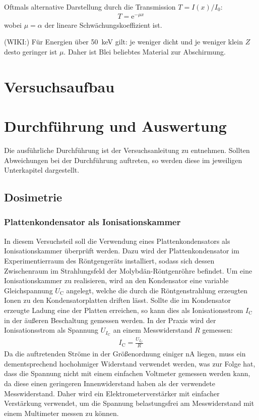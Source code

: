 \documentclass[11pt, a4paper]{article}
\numberwithin{equation}{section}
\begin{document}
Oftmals alternative Darstellung durch die Transmission $T = I(x)/I_0$:
\begin{align}
	T = \mathrm{e}^{-\mu x}
\end{align}
wobei $\mu = \alpha$ der lineare Schwächungskoeffizient ist.

(WIKI:) Für Energien über \SI{50}{keV} gilt:
je weniger dicht und je weniger klein $Z$ desto geringer ist $\mu$. Daher ist Blei beliebtes Material zur Abschirmung.

\section{Versuchsaufbau}

\section{Durchführung und Auswertung}
Die ausführliche Durchführung ist der Versuchsanleitung \cite{anleitung} zu entnehmen.
Sollten Abweichungen bei der Durchführung auftreten, so werden diese im jeweiligen Unterkapitel dargestellt.

\subsection{Dosimetrie}

\subsubsection{Plattenkondensator als Ionisationskammer}
In diesem Versuchsteil soll die Verwendung eines Plattenkondensators als Ionisationskammer überprüft werden.
Dazu wird der Plattenkondensator im Experimentierraum des Röntgengeräts installiert, sodass sich dessen Zwischenraum im Strahlungsfeld der Molybdän-Röntgenröhre befindet.
Um eine Ionisationskammer zu realisieren, wird an den Kondensator eine variable Gleichspannung $U_\mathrm{C}$ angelegt, welche die durch die Röntgenstrahlung erzeugten Ionen zu den Kondensatorplatten driften lässt.
Sollte die im Kondensator erzeugte Ladung eine der Platten erreichen, so kann dies als Ionisationsstrom $I_\mathrm{C}$ in der äußeren Beschaltung gemessen werden.
In der Praxis wird der Ionisationsstrom als Spannung $U_{I_\mathrm{C}}$ an einem Messwiderstand $R$ gemessen:
\begin{align}
	I_\mathrm{C} = \frac{U_{I_\mathrm{C}}}{R}
	\label{eq:ohm_ionisationsstrom}
\end{align}
Da die auftretenden Ströme in der Größenordnung einiger \si{nA} liegen, muss ein dementsprechend hochohmiger Widerstand verwendet werden, was zur Folge hat, dass die Spannung nicht mit einem einfachen Voltmeter gemessen werden kann, da diese einen geringeren Innenwiderstand haben als der verwendete Messwiderstand.
Daher wird ein Elektrometerverstärker mit einfacher Verstärkung verwendet, um die Spannung belastungsfrei am Messwiderstand mit einem Multimeter messen zu können.
\end{document}
